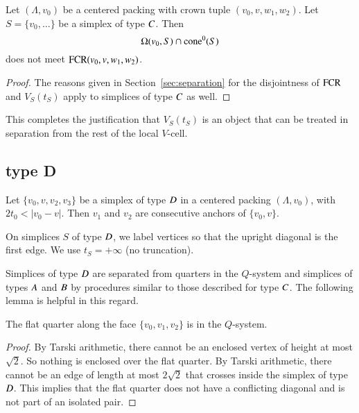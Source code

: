 \begin{lemma}
Let $(\Lambda,v_0)$ be a centered packing with crown tuple $(v_0,v,w_1,w_2)$.
Let $S=\{v_0,\ldots\}$ be a simplex of type $C$. Then
$$\Omega(v_0,S) \cap {\operatorname{cone}}^0(S)$$
does not meet ${\operatorname{FCR}}(v_0,v,w_1,w_2)$.
\end{lemma}

\begin{proof}
The reasons given in Section~\ref{sec:separation} for the
disjointness of ${\operatorname{FCR}}$ and $V_S(t_S)$ apply to simplices of
type $C$ as well. 
\end{proof}


This completes the justification that
$V_S(t_S)$ is an object that can be treated in separation from the
rest of the local $V$-cell.

\subsection{type D}%



\begin{lemma}
Let $\{v_0,v,v_2,v_3\}$ be a simplex of type $D$ 
in a centered packing $(\Lambda,v_0)$,
with $2t_0 < |v_0-v|$.
Then $v_1$ and $v_2$ are consecutive anchors of
$\{v_0,v\}$.
\end{lemma}

On simplices $S$ of type $D$, we label vertices so that the
upright diagonal is the first edge.  We use $t_S=+\infty$ (no
truncation).  

Simplices of type $D $ are separated from quarters in the
$Q$-system and simplices of types $A$ and $B$ by procedures
similar to those described for type $C$.  The following lemma is
helpful in this regard.


\begin{lemma}
The flat quarter along the face $\{v_0,v_1,v_2\}$ is
in the $Q$-system.
\end{lemma}

\begin{proof}
By Tarski arithmetic, there cannot be an enclosed vertex
of height at most $\sqrt2$. 
So nothing is enclosed over the flat quarter.
By Tarski arithmetic, there cannot be an edge of length
at most $2\sqrt2$ that crosses inside the simplex of type $D$.
This implies that the flat quarter does not have
a conflicting diagonal and is not part of an isolated pair.
\end{proof}


